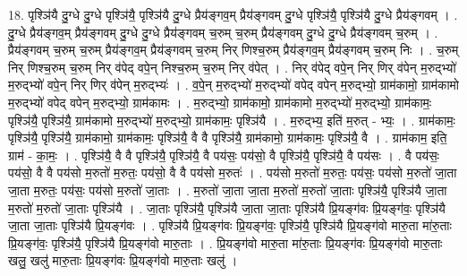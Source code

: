 \documentclass[17pt]{extarticle}
\begin{document}
18. पृश्ञि॑यै दु॒ग्धे दु॒ग्धे पृश्ञि॑यै॒ पृश्ञि॑यै दु॒ग्धे प्रैय॑ङ्गव॒म् प्रैय॑ङ्गवम् दु॒ग्धे पृश्ञि॑यै॒ पृश्ञि॑यै दु॒ग्धे प्रैय॑ङ्गवम् । . दु॒ग्धे प्रैय॑ङ्गव॒म् प्रैय॑ङ्गवम् दु॒ग्धे दु॒ग्धे प्रैय॑ङ्गवम् च॒रुम् च॒रुम् प्रैय॑ङ्गवम् दु॒ग्धे दु॒ग्धे प्रैय॑ङ्गवम् च॒रुम् । . प्रैय॑ङ्गवम् च॒रुम् च॒रुम् प्रैय॑ङ्गव॒म् प्रैय॑ङ्गवम् च॒रुम् निर् णिश्च॒रुम् प्रैय॑ङ्गव॒म् प्रैय॑ङ्गवम् च॒रुम् निः । . च॒रुम् निर् णिश्च॒रुम् च॒रुम् निर् व॑पेद् वपे॒न् निश्च॒रुम् च॒रुम् निर् व॑पेत् । . निर् व॑पेद् वपे॒न् निर् णिर् व॑पेन् म॒रुद्भ्यो॑ म॒रुद्भ्यो॑ वपे॒न् निर् णिर् व॑पेन् म॒रुद्भ्यः॑ । . व॒पे॒न् म॒रुद्भ्यो॑ म॒रुद्भ्यो॑ वपेद् वपेन् म॒रुद्भ्यो॒ ग्राम॑कामो॒ ग्राम॑कामो म॒रुद्भ्यो॑ वपेद् वपेन् म॒रुद्भ्यो॒ ग्राम॑कामः । . म॒रुद्भ्यो॒ ग्राम॑कामो॒ ग्राम॑कामो म॒रुद्भ्यो॑ म॒रुद्भ्यो॒ ग्राम॑कामः॒ पृश्ञि॑यै॒ पृश्ञि॑यै॒ ग्राम॑कामो म॒रुद्भ्यो॑ म॒रुद्भ्यो॒ ग्राम॑कामः॒ पृश्ञि॑यै । . म॒रुद्भ्य॒ इति॑ म॒रुत् - भ्यः॒ । . ग्राम॑कामः॒ पृश्ञि॑यै॒ पृश्ञि॑यै॒ ग्राम॑कामो॒ ग्राम॑कामः॒ पृश्ञि॑यै॒ वै वै पृश्ञि॑यै॒ ग्राम॑कामो॒ ग्राम॑कामः॒ पृश्ञि॑यै॒ वै । . ग्राम॑काम॒ इति॒ ग्राम॑ - का॒मः॒ । . पृश्ञि॑यै॒ वै वै पृश्ञि॑यै॒ पृश्ञि॑यै॒ वै पय॑सः॒ पय॑सो॒ वै पृश्ञि॑यै॒ पृश्ञि॑यै॒ वै पय॑सः । . वै पय॑सः॒ पय॑सो॒ वै वै पय॑सो म॒रुतो॑ म॒रुतः॒ पय॑सो॒ वै वै पय॑सो म॒रुतः॑ । . पय॑सो म॒रुतो॑ म॒रुतः॒ पय॑सः॒ पय॑सो म॒रुतो॑ जा॒ता जा॒ता म॒रुतः॒ पय॑सः॒ पय॑सो म॒रुतो॑ जा॒ताः । . म॒रुतो॑ जा॒ता जा॒ता म॒रुतो॑ म॒रुतो॑ जा॒ताः पृश्ञि॑यै॒ पृश्ञि॑यै जा॒ता म॒रुतो॑ म॒रुतो॑ जा॒ताः पृश्ञि॑यै । . जा॒ताः पृश्ञि॑यै॒ पृश्ञि॑यै जा॒ता जा॒ताः पृश्ञि॑यै प्रि॒यङ्ग॑वः प्रि॒यङ्ग॑वः॒ पृश्ञि॑यै जा॒ता जा॒ताः पृश्ञि॑यै प्रि॒यङ्ग॑वः । . पृश्ञि॑यै प्रि॒यङ्ग॑वः प्रि॒यङ्ग॑वः॒ पृश्ञि॑यै॒ पृश्ञि॑यै प्रि॒यङ्ग॑वो मारु॒ता मा॑रु॒ताः प्रि॒यङ्ग॑वः॒ पृश्ञि॑यै॒ पृश्ञि॑यै प्रि॒यङ्ग॑वो मारु॒ताः । . प्रि॒यङ्ग॑वो मारु॒ता मा॑रु॒ताः प्रि॒यङ्ग॑वः प्रि॒यङ्ग॑वो मारु॒ताः खलु॒ खलु॑ मारु॒ताः प्रि॒यङ्ग॑वः प्रि॒यङ्ग॑वो मारु॒ताः खलु॑ । \newline
\end{document}
